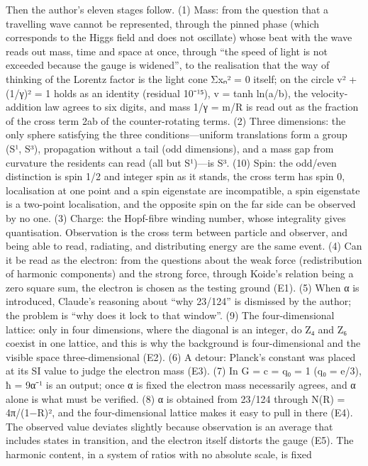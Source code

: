 \documentclass[
  a4paper,
]{article}
\begin{document}
Then the author's eleven stages follow. (1) Mass: from the question that
a travelling wave cannot be represented, through the pinned phase (which
corresponds to the Higgs field and does not oscillate) whose beat with
the wave reads out mass, time and space at once, through ``the speed of
light is not exceeded because the gauge is widened'', to the realisation
that the way of thinking of the Lorentz factor is the light cone Σxₙ² =
0 itself; on the circle v² + (1/γ)² = 1 holds as an identity (residual
10⁻¹⁵), v = tanh ln(a/b), the velocity-addition law agrees to six
digits, and mass 1/γ = m/R is read out as the fraction of the cross term
2ab of the counter-rotating terms. (2) Three dimensions: the only sphere
satisfying the three conditions---uniform translations form a group (S¹,
S³), propagation without a tail (odd dimensions), and a mass gap from
curvature the residents can read (all but S¹)---is S³. (10) Spin: the
odd/even distinction is spin 1/2 and integer spin as it stands, the
cross term has spin 0, localisation at one point and a spin eigenstate
are incompatible, a spin eigenstate is a two-point localisation, and the
opposite spin on the far side can be observed by no one. (3) Charge: the
Hopf-fibre winding number, whose integrality gives quantisation.
Observation is the cross term between particle and observer, and being
able to read, radiating, and distributing energy are the same event. (4)
Can it be read as the electron: from the questions about the weak force
(redistribution of harmonic components) and the strong force, through
Koide's relation being a zero square sum, the electron is chosen as the
testing ground (E1). (5) When α is introduced, Claude's reasoning about
``why 23/124'' is dismissed by the author; the problem is ``why does it
lock to that window''. (9) The four-dimensional lattice: only in four
dimensions, where the diagonal is an integer, do Z₄ and Z₆ coexist in
one lattice, and this is why the background is four-dimensional and the
visible space three-dimensional (E2). (6) A detour: Planck's constant
was placed at its SI value to judge the electron mass (E3). (7) In G = c
= q₀ = 1 (q₀ = e/3), ħ = 9α⁻¹ is an output; once α is fixed the electron
mass necessarily agrees, and α alone is what must be verified. (8) α is
obtained from 23/124 through N(R) = 4π/(1−R)², and the four-dimensional
lattice makes it easy to pull in there (E4). The observed value deviates
slightly because observation is an average that includes states in
transition, and the electron itself distorts the gauge (E5). The
harmonic content, in a system of ratios with no absolute scale, is fixed
\end{document}
